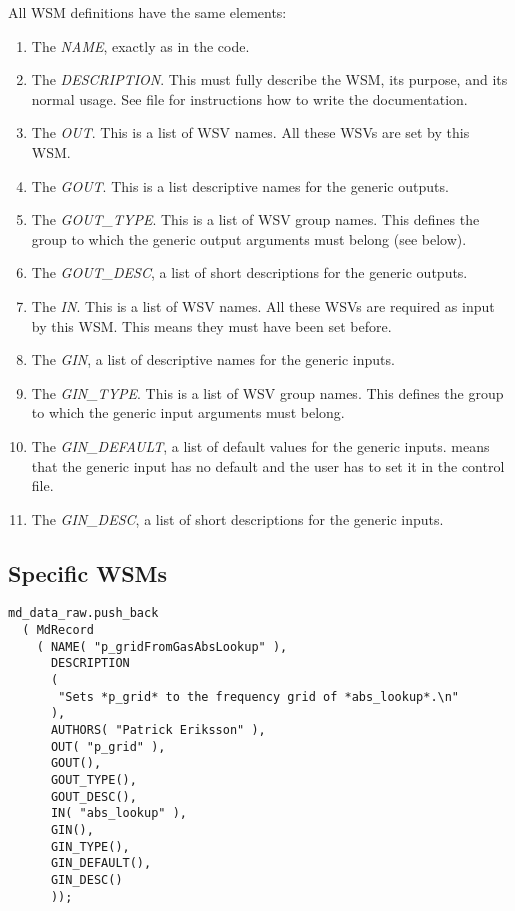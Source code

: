 \noindent
All WSM definitions have the same elements:
\begin{enumerate}
\item The \emph{NAME}, exactly as in the code.
\item The \emph{DESCRIPTION}. This must fully describe the WSM, its
  purpose, and its normal usage. See file  for
  instructions how to write the documentation.
\item The \emph{OUT}. This is a list of WSV names.
All these WSVs are set by this WSM.
\item The \emph{GOUT}. This is a list descriptive names for the generic
outputs.
\item The \emph{GOUT\_TYPE}. This is a list of WSV group names.
This defines the group to which the generic output arguments must belong
(see below).
\item The \emph{GOUT\_DESC}, a list of short descriptions for the generic outputs.
\item The \emph{IN}. This is a list of WSV names.
All these WSVs are required as input by this WSM. This means they must have
been set before.
\item The \emph{GIN}, a list of descriptive names for the generic inputs.
\item The \emph{GIN\_TYPE}. This is a list of WSV group names.
This defines the group to which the generic input arguments must belong.
\item The \emph{GIN\_DEFAULT}, a list of default values for the generic inputs.
 means that the generic input has no default and the user has
to set it in the control file.
\item The \emph{GIN\_DESC}, a list of short descriptions for the generic inputs.
\end{enumerate}

\subsection{Specific WSMs}

\begin{lstlisting}
md_data_raw.push_back     
  ( MdRecord
    ( NAME( "p_gridFromGasAbsLookup" ),
      DESCRIPTION
      (
       "Sets *p_grid* to the frequency grid of *abs_lookup*.\n"
      ),
      AUTHORS( "Patrick Eriksson" ),
      OUT( "p_grid" ),
      GOUT(),
      GOUT_TYPE(),
      GOUT_DESC(),
      IN( "abs_lookup" ),
      GIN(),
      GIN_TYPE(),
      GIN_DEFAULT(),
      GIN_DESC()
      ));
\end{lstlisting}

